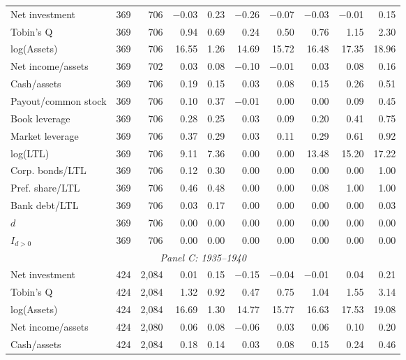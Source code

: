 \begin{table}[p]
\begin{threeparttable}
\begin{tabular}{lrrrrrrrrr}
            \midrule
            Net investment & 369 & 706 & $-$0.03 & 0.23 & $-$0.26 & $-$0.07 & $-$0.03 & $-$0.01 & 0.15 \\
            Tobin's Q & 369 & 706 & 0.94 & 0.69 & 0.24 & 0.50 & 0.76 & 1.15 & 2.30 \\
            log(Assets) & 369 & 706 & 16.55 & 1.26 & 14.69 & 15.72 & 16.48 & 17.35 & 18.96 \\
            Net income/assets & 369 & 702 & 0.03 & 0.08 & $-$0.10 & $-$0.01 & 0.03 & 0.08 & 0.16 \\
            Cash/assets & 369 & 706 & 0.19 & 0.15 & 0.03 & 0.08 & 0.15 & 0.26 & 0.51 \\
            Payout/common stock & 369 & 706 & 0.10 & 0.37 & $-$0.01 & 0.00 & 0.00 & 0.09 & 0.45 \\
            Book leverage & 369 & 706 & 0.28 & 0.25 & 0.03 & 0.09 & 0.20 & 0.41 & 0.75 \\
            Market leverage & 369 & 706 & 0.37 & 0.29 & 0.03 & 0.11 & 0.29 & 0.61 & 0.92 \\
            log(LTL) & 369 & 706 & 9.11 & 7.36 & 0.00 & 0.00 & 13.48 & 15.20 & 17.22 \\
            Corp. bonds/LTL & 369 & 706 & 0.12 & 0.30 & 0.00 & 0.00 & 0.00 & 0.00 & 1.00 \\
            Pref. share/LTL & 369 & 706 & 0.46 & 0.48 & 0.00 & 0.00 & 0.08 & 1.00 & 1.00 \\
            Bank debt/LTL & 369 & 706 & 0.03 & 0.17 & 0.00 & 0.00 & 0.00 & 0.00 & 0.03 \\
            \ensuremath{d} & 369 & 706 & 0.00 & 0.00 & 0.00 & 0.00 & 0.00 & 0.00 & 0.00 \\
            \ensuremath{I_{d>0}} & 369 & 706 & 0.00 & 0.00 & 0.00 & 0.00 & 0.00 & 0.00 & 0.00 \\
            \midrule
            \multicolumn{10}{c}{\textit{Panel C: 1935--1940}} \\
            \midrule
            Net investment & 424 & 2,084 & 0.01 & 0.15 & $-$0.15 & $-$0.04 & $-$0.01 & 0.04 & 0.21 \\
            Tobin's Q & 424 & 2,084 & 1.32 & 0.92 & 0.47 & 0.75 & 1.04 & 1.55 & 3.14 \\
            log(Assets) & 424 & 2,084 & 16.69 & 1.30 & 14.77 & 15.77 & 16.63 & 17.53 & 19.08 \\
            Net income/assets & 424 & 2,080 & 0.06 & 0.08 & $-$0.06 & 0.03 & 0.06 & 0.10 & 0.20 \\
            Cash/assets & 424 & 2,084 & 0.18 & 0.14 & 0.03 & 0.08 & 0.15 & 0.24 & 0.46 \\

\end{tabular}
\end{threeparttable}
\end{table}
